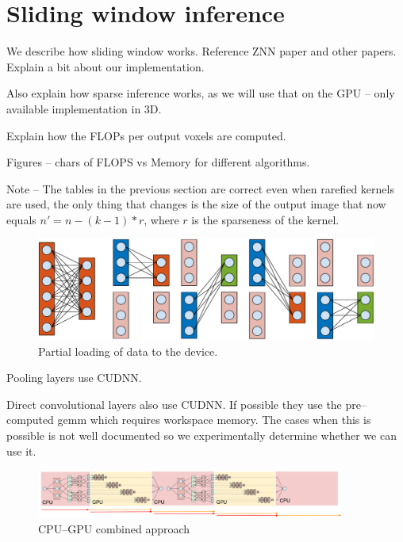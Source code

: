 \documentclass[conference]{IEEEtran}
\begin{document}
\section{Sliding window inference}

We describe how sliding window works.  Reference ZNN paper and other
papers.  Explain a bit about our implementation.

Also explain how sparse inference works, as we will use that on the
GPU -- only available implementation in 3D.

Explain how the FLOPs per output voxels are computed.

Figures -- chars of FLOPS vs Memory for different algorithms.

Note -- The tables in the previous section are correct even when
rarefied kernels are used, the only thing that changes is the size of
the output image that now equals $n' = n - (k-1)*r$, where $r$ is the
sparseness of the kernel.



\begin{figure}
  \begin{center}
  \includegraphics[width=0.95\columnwidth]{fig/gpuram.pdf}
  \end{center}
  \caption{Partial loading of data to the device.}
  \label{fig:partial_exec}
\end{figure}

Pooling layers use CUDNN.

Direct convolutional layers also use CUDNN.  If possible they use the
pre--computed gemm which requires workspace memory.  The cases when
this is possible is not well documented so we experimentally determine
whether we can use it.

\begin{figure}
  \centering
  \includegraphics[width=0.9\textwidth]{fig/fusion.pdf}
  \caption{CPU--GPU combined approach}
  \label{fig:fusion}
\end{figure}
\end{document}
